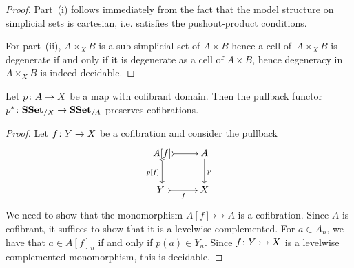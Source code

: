 \documentclass[reqno,10pt,a4paper,oneside,draft]{amsart}
\begin{document}
\begin{proof} Part~(i) follows immediately from the fact that the model structure on simplicial sets is cartesian, i.e. satisfies the pushout-product conditions.


For part~(ii), $A \times_X B$ is a sub-simplicial set of $A \times B$ hence a cell of~$A \times_X B$ is degenerate if and only if it is degenerate as a cell of $A \times B$, hence degeneracy
in~$A \times_X B$ is indeed decidable. 
\end{proof}





\begin{proposition} \label{thm:cof-pbk}  Let $p \colon A \to X$  be a map with cofibrant domain.
Then the pullback functor $p^* \colon \mathbf{SSet}_{/X} \to \mathbf{SSet}_{/A}$ preserves cofibrations. 
\end{proposition}

\begin{proof} Let $f \colon Y \to X$ be a cofibration and consider the pullback
\[
\xymatrix{
A[f]  \ar@{>->}[r] \ar@{>->}[d]_-{p[f]} &  A \ar[d]^{p} \\
Y \ar@{>->}[r]_{f} \ & X}
\]
We need to show that the monomorphism $A[f] \rightarrowtail A$ is a cofibration. 
Since $A$ is cofibrant, it suffices to show that it is a levelwise complemented. For $a \in A_n$, we have that $a \in A[f]_n$ if and only if $p(a) \in Y_n$. Since $f \colon Y \rightarrowtail X$ is a levelwise complemented monomorphism, this is decidable.
\end{proof} 
\end{document}
